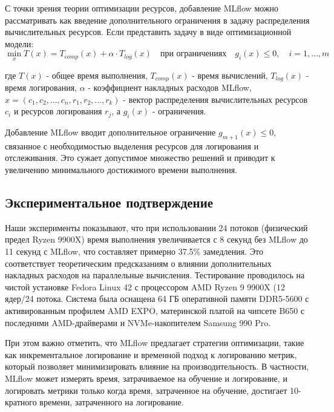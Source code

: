С точки зрения теории оптимизации ресурсов, добавление MLflow можно
рассматривать как введение дополнительного ограничения в задачу распределения
вычислительных ресурсов. Если представить задачу в виде оптимизационной модели:
\begin{equation}
	\min_{x} T(x) = T_{comp}(x) + \alpha \cdot T_{log}(x) \quad \text{при ограничениях} \quad g_i(x) \leq 0, \quad i = 1, \ldots, m
\end{equation}

где $T(x)$ - общее время выполнения, $T_{comp}(x)$ - время вычислений, $T_{log}(x)$ - время логирования, $\alpha$ - коэффициент накладных расходов MLflow, $x = (c_1, c_2, ..., c_n, r_1, r_2, ..., r_k)$ - вектор распределения вычислительных ресурсов $c_i$ и ресурсов логирования $r_j$, а $g_i(x)$ - ограничения.

Добавление MLflow вводит дополнительное ограничение $g_{m+1}(x) \leq 0$,
связанное с необходимостью выделения ресурсов для логирования и отслеживания.
Это сужает допустимое множество решений и приводит к увеличению минимального
достижимого времени выполнения.

\subsection{Экспериментальное подтверждение}

Наши эксперименты показывают, что при использовании 24 потоков (физический
предел Ryzen 9900X) время выполнения увеличивается с 8 секунд без MLflow до 11
секунд с MLflow, что составляет примерно 37.5\% замедления. Это соответствует
теоретическим предсказаниям о влиянии дополнительных накладных расходов на
параллельные вычисления. Тестирование проводилось на чистой установке Fedora Linux 42 с процессором AMD Ryzen 9 9900X (12 ядер/24 потока. Система была оснащена 64 ГБ оперативной памяти DDR5-5600 с активированным профилем AMD EXPO, материнской платой на чипсете B650 с последними AMD-драйверами и NVMe-накопителем Samsung 990 Pro.

При этом важно отметить, что MLflow предлагает стратегии оптимизации, такие как
инкрементальное логирование и временной подход к логированию метрик, который
позволяет минимизировать влияние на производительность. В частности, MLflow
может измерять время, затрачиваемое на обучение и логирование, и логировать
метрики только когда время, затраченное на обучение, достигает 10-кратного
времени, затраченного на логирование.

